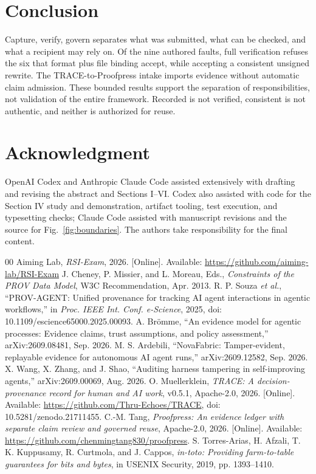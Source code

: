 \documentclass[conference]{IEEEtran}
\begin{document}
\section{Conclusion}
Capture, verify, govern separates what was submitted, what can be checked, and what a recipient may rely on. Of the nine authored faults, full verification refuses the six that format plus file binding accept, while accepting a consistent unsigned rewrite. The TRACE-to-Proofpress intake imports evidence without automatic claim admission. These bounded results support the separation of responsibilities, not validation of the entire framework. Recorded is not verified, consistent is not authentic, and neither is authorized for reuse.

\section*{Acknowledgment}
OpenAI Codex and Anthropic Claude Code assisted extensively with drafting and revising the abstract and Sections I--VI. Codex also assisted with code for the Section IV study and demonstration, artifact tooling, test execution, and typesetting checks; Claude Code assisted with manuscript revisions and the source for Fig.~\ref{fig:boundaries}. The authors take responsibility for the final content.

\begin{thebibliography}{00}
 Aiming Lab, \emph{RSI-Exam}, 2026. [Online]. Available: \url{https://github.com/aiming-lab/RSI-Exam}
 J. Cheney, P. Missier, and L. Moreau, Eds., \emph{Constraints of the PROV Data Model}, W3C Recommendation, Apr. 2013.
 R. P. Souza \emph{et al.}, ``PROV-AGENT: Unified provenance for tracking AI agent interactions in agentic workflows,'' in \emph{Proc. IEEE Int. Conf. e-Science}, 2025, doi: 10.1109/escience65000.2025.00093.
 A. Br\"{o}mme, ``An evidence model for agentic processes: Evidence claims, trust assumptions, and policy assessment,'' arXiv:2609.08481, Sep. 2026.
 M. S. Ardebili, ``NovaFabric: Tamper-evident, replayable evidence for autonomous AI agent runs,'' arXiv:2609.12582, Sep. 2026.
 X. Wang, X. Zhang, and J. Shao, ``Auditing harness tampering in self-improving agents,'' arXiv:2609.00069, Aug. 2026.
 O. Muellerklein, \emph{TRACE: A decision-provenance record for human and AI work}, v0.5.1, Apache-2.0, 2026. [Online]. Available: \url{https://github.com/Thru-Echoes/TRACE}, doi: 10.5281/zenodo.21711455.
 C.-M. Tang, \emph{Proofpress: An evidence ledger with separate claim review and governed reuse}, Apache-2.0, 2026. [Online]. Available: \url{https://github.com/chenmingtang830/proofpress}.
 S. Torres-Arias, H. Afzali, T. K. Kuppusamy, R. Curtmola, and J. Cappos, \emph{in-toto: Providing farm-to-table guarantees for bits and bytes}, in USENIX Security, 2019, pp. 1393--1410.\end{thebibliography}
\end{document}
